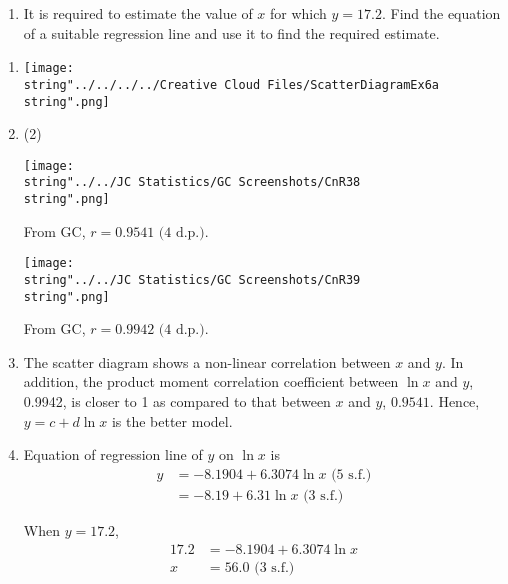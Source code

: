 \documentclass[11pt,a4paper]{book}
\begin{document}
\begin{example}
\begin{enumerate}[label=(\alph*),start=2]
\item  It is required to estimate the value of $x$ for which $y=17.2$.
Find the equation of a suitable regression line and use it to find
the required estimate.

\end{enumerate}

\Solution

\begin{enumerate}[label=(\alph*)]

\item  \texttt{[image: \\string"../../../../Creative Cloud Files/ScatterDiagramEx6a\\string".png]}

\newpage

\item \begin{tasks}[label=(\roman*),label-width=3.5ex](2)

\task \texttt{[image: \\string"../../JC Statistics/GC Screenshots/CnR38\\string".png]}

From GC, $r=0.9541\text{ (4 d.p.)}$.

\task \texttt{[image: \\string"../../JC Statistics/GC Screenshots/CnR39\\string".png]}

From GC, $r=0.9942\text{ (4 d.p.)}$.

\end{tasks}

\item  The scatter diagram shows a non-linear correlation between
$x$ and $y$. In addition, the product moment correlation coefficient
between $\ln x$ and $y$, 0.9942, is closer to 1 as compared to that
between $x$ and $y$, $0.9541$. Hence, $y=c+d\ln x$ is the better
model.

\item  Equation of regression line of $y$ on $\ln x$ is
\begin{align*}
y & =-8.1904+6.3074\ln x\text{ (5 s.f.)}\\
 & =-8.19+6.31\ln x\text{ (3 s.f.)}
\end{align*}

When $y=17.2$,
\begin{align*}
17.2 & =-8.1904+6.3074\ln x\\
x & =56.0\text{ (3 s.f.)}
\end{align*}

\end{enumerate}
\end{example}

\end{document}
